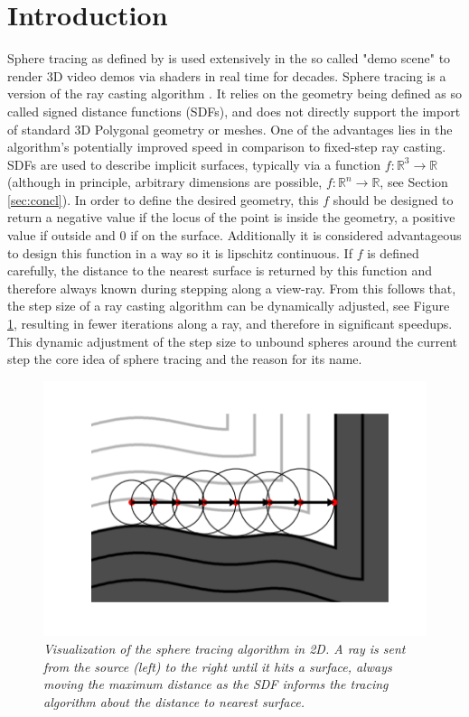 \documentclass[twoside,a4paper]{article}
\begin{document}
\section{Introduction}
\label{sec:intro}
Sphere tracing as defined by \cite{hart_sphere_1996} is used extensively in the so called "demo scene" to render 3D video demos via shaders in real time for decades. 
Sphere tracing is a version of the ray casting algorithm \cite{roth_ray_1982}. It relies on the geometry being defined as so called signed distance functions (SDFs), and does not directly support the import of standard 3D Polygonal geometry or meshes. One of the advantages lies in the algorithm's potentially improved speed in comparison to fixed-step ray casting. SDFs are used to describe implicit surfaces, typically via a function $f : \mathbb{R}^3 \rightarrow \mathbb{R}$(although in principle, arbitrary dimensions are possible, $f : \mathbb{R}^n \rightarrow \mathbb{R}$, see Section \ref{sec:concl}). In order to define the desired geometry, this $f$ should be designed to return a negative value if the locus of the point is inside the geometry, a positive value if outside and 0 if on the surface. Additionally it is considered advantageous to design this function in a way so it is lipschitz continuous. If $f$ is defined carefully, the distance to the nearest surface is returned by this function and therefore always known during stepping along a view-ray. 
From this follows that, the step size of a ray casting algorithm can be dynamically adjusted, see Figure \ref{sphereViz}, resulting in fewer iterations along a ray, and therefore in significant speedups. This dynamic adjustment of the step size to unbound spheres around the current step the core idea of sphere tracing and the reason for its name\cite{hart_sphere_1996}.

\begin{figure}[ht]
\centerline{\includegraphics[scale=0.5]{img/sphereTracingViz.png}}
\caption{\label{sphereViz}{\it Visualization of the sphere tracing algorithm in 2D. A ray is sent from the source (left) to the right until it hits a surface, always moving the maximum distance as the SDF informs the tracing algorithm about the distance to nearest surface.}}
\end{figure}
\end{document}
